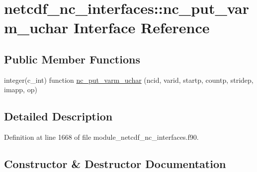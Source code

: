 \hypertarget{interfacenetcdf__nc__interfaces_1_1nc__put__varm__uchar}{}\section{netcdf\+\_\+nc\+\_\+interfaces\+:\+:nc\+\_\+put\+\_\+varm\+\_\+uchar Interface Reference}
\label{interfacenetcdf__nc__interfaces_1_1nc__put__varm__uchar}
\subsection*{Public Member Functions}
\begin{DoxyCompactItemize}
\item 
integer(c\+\_\+int) function \hyperlink{interfacenetcdf__nc__interfaces_1_1nc__put__varm__uchar_aacedcf99a558cb96c5570659b33e94ac}{nc\+\_\+put\+\_\+varm\+\_\+uchar} (ncid, varid, startp, countp, stridep, imapp, op)
\end{DoxyCompactItemize}


\subsection{Detailed Description}


Definition at line 1668 of file module\+\_\+netcdf\+\_\+nc\+\_\+interfaces.\+f90.



\subsection{Constructor \& Destructor Documentation}
\mbox{\label{interfacenetcdf__nc__interfaces_1_1nc__put__varm__uchar_aacedcf99a558cb96c5570659b33e94ac}} 
